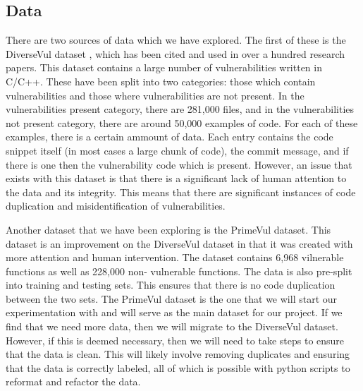 \documentclass{article}
\begin{document}
\subsection{Data}
There are two sources of data which we have explored. The first of these is the 
DiverseVul dataset \cite{chen2023diversevulnewvulnerablesource}, which has been cited and used in over a hundred research papers. This dataset contains a large number of vulnerabilities written in C/C++.
These have been split into two categories: those which contain vulnerabilities and those
where vulnerabilities are not present. In the vulnerabilities present category, there are 
281,000 files, and in the vulnerabilities not present category, there are around 50,000
examples of code. For each of these examples, there is a certain ammount of data. Each entry
contains the code snippet itself (in most cases a large chunk of code), the commit message, and if there is one then the vulnerability code which is present. However, an issue that exists
with this dataset is that there is a significant lack of human attention to the data
and its integrity. This means that there are significant instances of code duplication and
misidentification of vulnerabilities.

Another dataset that we have been exploring is the PrimeVul \cite{ding2024vulnerabilitydetectioncodelanguage} dataset. This dataset is an 
improvement on the DiverseVul dataset in that it was created with more attention and human
intervention. The dataset contains 6,968 vilnerable functions as well as 228,000 non-
vulnerable functions. The data is also pre-split into training and testing sets. This ensures
that there is no code duplication between the two sets. The PrimeVul dataset is the one that
we will start our experimentation with and will serve as the main dataset for our project.
If we find that we need more data, then we will migrate to the DiverseVul dataset. However,
if this is deemed necessary, then we will need to take steps to ensure that the data is clean.
This will likely involve removing duplicates and ensuring that the data is correctly labeled,
all of which is possible with python scripts to reformat and refactor the data. 
\end{document}
